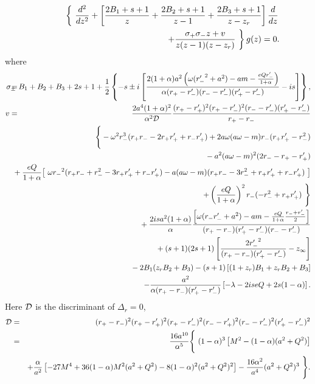 \begin{eqnarray}
&&\makebox[-2cm]{}
\left\{ \ \frac{d^2}{dz^2} + \left[\frac{2B_1+s+1}{z} + \frac{2B_2+s+1}{z-1}
+\frac{2B_3+s+1}{z-z_r} \right] \frac{d}{dz} \right. \nonumber \\ && \makebox[5cm]{}\left.
+ \frac{\sigma_+ \sigma_- z + v}{z (z-1)(z-z_r)} \ \right\} g(z) =0.
\label{eqn:HR}
\end{eqnarray}
%
where 
%
\begin{eqnarray}
\sigma_\pm \makebox[-3mm]{}&=&\makebox[-3mm]{} B_1 + B_2 + B_3 + 2s+1 
+\frac{1}{2}\left\{-s \pm i\left[
\frac{2(1+\alpha)a^2
\left(\omega({r'_-}^2 + a^2)-am-\frac{eQr'_-}
{1+\alpha}\right)}
{\alpha(r_+ - r'_-)(r_- - r'_-)(r'_+ - r'_-)}
- is \right]\right\}, \nonumber \\
v &=&   \frac{2a^4 (1+\alpha)^2}{\alpha^2 {\cal D}}
        \frac{(r_+ - r'_+)^2 (r_+ - r'_-)^2 (r_- - r'_-) (r'_+ - r'_-)}
{r_+ - r_-} \nonumber \\
&& \makebox[-7mm]{}
\Bigg\{-\omega^2 r_-^3(r_+ r_- - 2r_+ r'_+ + r_- r'_+)
+2a\omega(a\omega-m)r_- (r_+ r'_+ - r_-^2) \nonumber \\
&&  \makebox[7cm]{}-a^2(a\omega-m)^2(2r_- - r_+ - r'_+) \nonumber \\
&& \makebox[-7mm]{}
+\frac{eQ}{1+\alpha} 
\big[ \ \omega{r_-}^2(r_+ r_- + r_-^2 -3r_+ r'_+ + r_- r'_+)
- a(a\omega-m)(r_+ r_- -3r_-^2 +r_+ r'_+ + r_- r'_+)
\  \big]  \nonumber \\
&& + \left(\frac{eQ}{1+\alpha}\right)^2 r_-(-r^2_- +r_+ r'_+) \ \Bigg\} 
\nonumber \\
&& \makebox[-7mm]{}
+\frac{2isa^2(1+\alpha)}{\alpha}
\frac{\left[ \omega (r_- r'_- +a^2)-am 
-\frac{eQ}{1+\alpha}\frac{r_- +r'_-}{2} \right]}
{(r_+ - r_-)(r'_+ - r'_-)(r_- - r'_-)}  \nonumber \\
&& \makebox[-5mm]{}
+(s+1)(2s+1)\left[\frac{2{r'_-}^2}
{(r_+ - r_-)(r'_+ -r'_-)}-z_\infty\right]
\nonumber \\
&& \makebox[-3mm]{}
- 2B_1(z_r B_2+B_3)-(s+1)\left[ (1+z_r)B_1+z_rB_2+B_3 \right] \nonumber \\
&& -\frac{a^2}{\alpha(r_+ - r_-)(r'_+ - r'_-)} 
\left[-\lambda-2iseQ+2s(1-\alpha)\right].
\end{eqnarray}
%
Here ${\cal D}$ is the discriminant of $\Delta_r = 0$,
%
\begin{eqnarray}
{\cal D}&=&(r_+ - r_-)^2 (r_+ - r'_+)^2 (r_+ - r'_-)^2
(r_- - r'_+)^2 (r_- - r'_-)^2 (r'_+ - r'_-)^2 \nonumber \\
&=& \frac{16a^{10}}{\alpha^5}\Bigg\{ \ 
(1-\alpha)^3\left[M^2-(1-\alpha)(a^2+Q^2)\right] \nonumber \\ &&  +\frac{\alpha}{a^2}\left[-27M^4+36(1-\alpha)M^2(a^2+Q^2)
- 8(1-\alpha)^2(a^2+Q^2)^2\right]
-\frac{16\alpha^2}{a^4}(a^2+Q^2)^3 \ \Bigg\}. \nonumber
\end{eqnarray}

